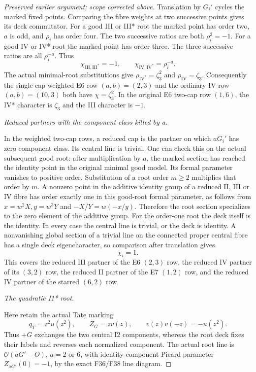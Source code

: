 \begin{proof}[Preserved earlier argument; scope corrected above]
Translation by \(G_i'\) cycles the marked fixed points. Comparing
the fibre weights at two successive points gives its deck
commutator. For a good III or III* root the marked point has order
two, \(a\) is odd, and \(\rho_i\) has order four. The two successive
ratios are both \(\rho_i^2=-1\). For a good IV or IV* root the
marked point has order three. The three successive ratios are
all \(\rho_i^{-a}\). Thus
\[
 \chi_{\mathrm{III},\mathrm{III}^*}=-1,\qquad
 \chi_{\mathrm{IV},\mathrm{IV}^*}=\rho_i^{-a}.           \tag{P3K.35.10}
\]
The actual minimal-root substitutions give
\(\rho_{\mathrm{IV}^*}=\zeta_3^2\) and
\(\rho_{\mathrm{IV}}=\zeta_3\). Consequently the single-cap
weighted E6 row \((a,b)=(2,3)\) and the ordinary IV row
\((a,b)=(10,3)\) both have \(\chi=\zeta_3^2\).
In the original E6 two-cap row \((1,6)\), the IV* character is
\(\zeta_3\) and the III character is \(-1\).

\par\smallskip\noindent\textit{Reduced partners with the component class killed by a.}\enspace

In the weighted two-cap rows, a reduced cap is the partner on
which \(aG_i'\) has zero component class. Its central line is
trivial. One can check this on the actual subsequent good root:
after multiplication by \(a\), the marked section has reached
the identity point in the original minimal good model. Its
formal parameter vanishes to positive order. Substitution of a
root order \(m\ge2\) multiplies that order by \(m\). A nonzero
point in the additive identity group of a reduced II, III or IV
fibre has order exactly one in this good-root formal parameter,
as follows from \(x=w^2X,y=w^3Y\) and
\(-X/Y=w(-x/y)\). Therefore the root section specializes to
the zero element of the additive group. For the order-one root
the deck itself is the identity. In every case the central line
is trivial, or the deck is identity. A nonvanishing global
section of a trivial line on the connected proper central fibre
has a single deck eigencharacter, so comparison after translation
gives
\[
                              \chi_i=1.                 \tag{P3K.35.11}
\]
This covers the reduced III partner of the E6 \((2,3)\) row,
the reduced IV partner of its \((3,2)\) row, the reduced II
partner of the E7 \((1,2)\) row, and the reduced IV partner
of the starred \((6,2)\) row.

\par\smallskip\noindent\textit{The quadratic I1* root.}\enspace

Here retain the actual Tate marking
\[
 q_T=z^2u(z^2),\qquad Z_G=zv(z),\qquad
 v(z)v(-z)=-u(z^2).
\]
Thus \(+G\) exchanges the two central I2 components, whereas
the root deck fixes their labels and reverses each normalized
component. The actual root line is \(\mathcal O(aG'-O)\),
\(a=2\) or \(6\), with identity-component Picard parameter
\(Z_{aG'}(0)=-1\), by the exact F36/F38 line diagram.


\end{proof}
